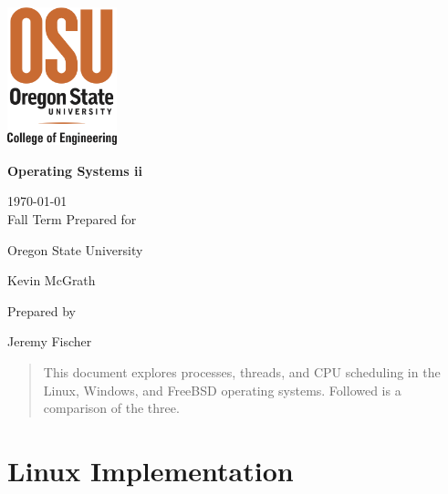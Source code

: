 \documentclass[onecolumn,draftclsnofoot, 10pt, compsoc]{IEEEtran}
\def \GroupNumber{		17}
\def \Jeremy{			Jeremy Fischer}
\def \Class{		Operating Systems ii}
\def \School{	Oregon State University}
\def \Professor{		 Kevin McGrath}
\begin{document}
\begin{titlepage}
    \begin{singlespace}
    	\includegraphics[height=4cm]{coe.eps}
        \hfill  
        \par\vspace{.2in}
        \centering
        \scshape{
            \vspace{.5in}
            \textbf{\Huge\Class}\par
            \large{
            	\today \\Fall Term
        	}
            \vfill
            {\large Prepared for}\par
            \huge \School\par
            \vspace{5pt}
            {\Large{\Professor}\par}
            {\large Prepared by }\par
            \vspace{5pt}
            {\Large
                {\Jeremy}\par
            }
            \vspace{20pt}
        }
        \begin{abstract}
        	This document explores processes, threads, and CPU scheduling in the Linux, Windows, and FreeBSD operating systems. Followed is a comparison of the three.
        \end{abstract}     
    \end{singlespace}
\end{titlepage}
\newpage
{}
\tableofcontents
\clearpage









\section{Linux Implementation}
\end{document}
